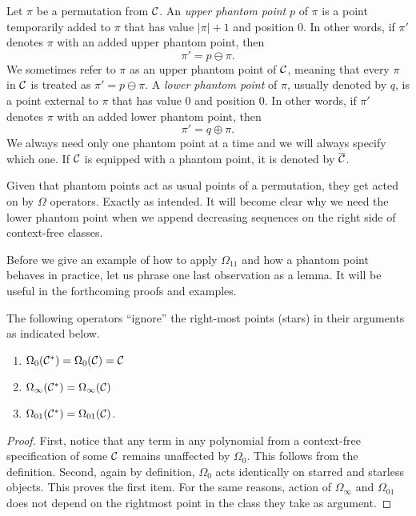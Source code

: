 \documentclass[12pt, a4paper, twoside]{report}
\begin{document}
\begin{definition}
  Let $\pi$ be a permutation from $\mathcal{C}$. An \emph{upper phantom point} $p$ of $\pi$ is a point temporarily added to $\pi$ that has value $|\pi|+1$ and position $0$. In other words, if $\pi'$ denotes $\pi$ with an added upper phantom point, then
  $$\pi' = p \ominus \pi.$$
  We sometimes refer to $\pi$ as an upper phantom point of $\mathcal{C}$, meaning that every $\pi$ in $\mathcal{C}$ is treated as $\pi' = p \ominus \pi$. A \emph{lower phantom point} of $\pi$, usually denoted by $q$, is a point external to $\pi$ that has value $0$ and position $0$. In other words, if $\pi'$ denotes $\pi$ with an added lower phantom point, then
  $$\pi' = q \oplus \pi.$$
We always need only one phantom point at a time and we will always specify which one. If $\mathcal{C}$ is equipped with a phantom point, it is denoted by $\overline{\mathcal{C}}$.
\end{definition}
Given that phantom points act as usual points of a permutation, they get acted on by $\Omega$ operators. Exactly as intended. It will become clear why we need the lower phantom point when we append decreasing sequences on the right side of context-free classes.

Before we give an example of how to apply $\Omega_{11}$ and how a phantom point behaves in practice, let us phrase one last observation as a lemma. It will be useful in the forthcoming proofs and examples.

\begin{lemma}
  The following operators ``ignore'' the right-most points (stars) in their arguments as indicated below.
  \begin{enumerate}
  \item $\Omega_0(\mathcal{C}^*) = \Omega_0(\mathcal{C}) = \mathcal{C}$
  \item $\Omega_\infty(\mathcal{C}^*) = \Omega_\infty(\mathcal{C})$
  \item $\Omega_{01}(\mathcal{C}^*) = \Omega_{01}(\mathcal{C})$.
  \end{enumerate}
  \label{lem:ignorance}
\end{lemma}
\begin{proof}
First, notice that any term in any polynomial from a context-free specification of some $\mathcal{C}$ remains unaffected by $\Omega_0$. This follows from the definition. Second, again by definition, $\Omega_0$ acts identically on starred and starless objects. This proves the first item. For the same reasons, action of $\Omega_\infty$ and $\Omega_{01}$ does not depend on the rightmost point in the class they take as argument.
\end{proof}
\end{document}
